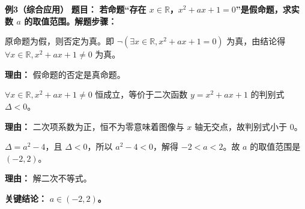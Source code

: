 \begin{examplebox}
	\medskip
	\textbf{\textcolor{CExample}{例3（综合应用）}}
	\textbf{\textcolor{CExample}{题目：}} \textbf{若命题“存在 $x\in\mathbb{R}$，$x^2+ax+1=0$”是假命题，求实数 $a$ 的取值范围。}\textbf{\textcolor{CExample}{解题步骤：}}
	\begin{description}[style=nextline, leftmargin=2.8em, labelsep=0.5em, itemsep=0.45em]
		\item[\textbf{第一步（否定为真）：}]
			原命题为假，则否定为真。即 $\neg(\exists x\in\mathbb{R}, x^2+ax+1=0)$ 为真，由结论得 $\forall x\in\mathbb{R}, x^2+ax+1\neq 0$ 为真。
			\par\textbf{理由：} 假命题的否定是真命题。
		\item[\textbf{第二步（恒不等条件）：}]
			$\forall x\in\mathbb{R}, x^2+ax+1\neq0$ 恒成立，等价于二次函数 $y=x^2+ax+1$ 的判别式 $\Delta<0$。
			\par\textbf{理由：} 二次项系数为正，恒不为零意味着图像与 $x$ 轴无交点，故判别式小于 $0$。
		\item[\textbf{第三步（解不等式）：}]
			$\Delta = a^2-4$，且 $\Delta<0$，所以 $a^2-4<0$，解得 $-2<a<2$。故 $a$ 的取值范围是 $(-2,2)$。
			\par\textbf{理由：} 解二次不等式。
	\end{description}
	\textbf{\textcolor{CExample}{关键结论：}}
	\textbf{$a\in(-2,2)$。}
\end{examplebox}
